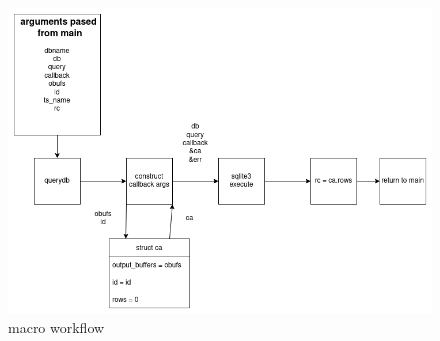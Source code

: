 \begin{figure} [H]
  \centering
  \includegraphics[width=\textwidth]{images/querydb_macro.png}
  \caption{\querydb macro workflow}
\end{figure}
